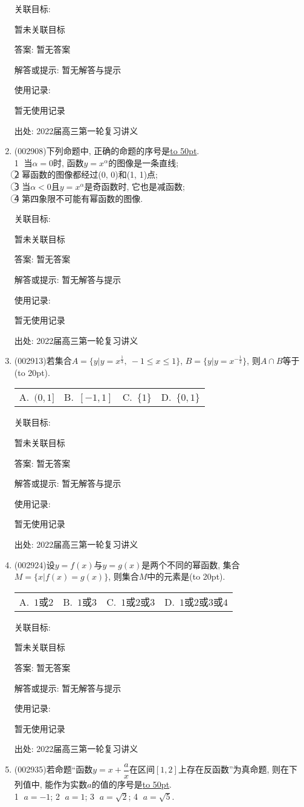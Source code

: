 \documentclass[10pt,a4paper]{article}
\newcommand{\blank}[1]{\underline{\hbox to #1pt{}}}
\newcommand{\bracket}[1]{(\hbox to #1pt{})}
\newcommand{\fourch}[4]{\par\begin{tabular}{p{.23\textwidth}p{.23\textwidth}p{.23\textwidth}p{.23\textwidth}}
A.~#1 &B.~#2& C.~#3& D.~#4
\end{tabular}}
\begin{document}
\begin{enumerate}[1.]
关联目标:

暂未关联目标

答案: 暂无答案

解答或提示: 暂无解答与提示

使用记录:

暂无使用记录


出处: 2022届高三第一轮复习讲义
\item { (002908)}下列命题中, 正确的命题的序号是\blank{50}.\\
\textcircled{1} 当$\alpha =0$时, 函数$y={x^{\alpha }}$的图像是一条直线;\\
\textcircled{2} 幂函数的图像都经过(0, 0)和(1, 1)点;\\
\textcircled{3} 当$\alpha <0$且$y={x^{\alpha }}$是奇函数时, 它也是减函数;\\
\textcircled{4} 第四象限不可能有幂函数的图像.


关联目标:

暂未关联目标

答案: 暂无答案

解答或提示: 暂无解答与提示

使用记录:

暂无使用记录


出处: 2022届高三第一轮复习讲义
\item { (002913)}若集合$A=\{y|y={x^{\frac 13}}, \ -1\le x\le 1\}$, $B=\{y|y={x^{-\frac 12}}\}$, 则$A\cap B$等于\bracket{20}.
\fourch{$(0,1]$}{$[-1,1]$}{$\{1\}$}{$\{0,1\}$}


关联目标:

暂未关联目标

答案: 暂无答案

解答或提示: 暂无解答与提示

使用记录:

暂无使用记录


出处: 2022届高三第一轮复习讲义
\item { (002924)}设$y=f(x)$与$y=g(x)$是两个不同的幂函数, 集合$M=\{x|f(x)=g(x)  \}$, 则集合$M$中的元素是\bracket{20}.
\fourch{$1$或$2$}{$1$或$3$}{$1$或$2$或$3$}{$1$或$2$或$3$或$4$}


关联目标:

暂未关联目标

答案: 暂无答案

解答或提示: 暂无解答与提示

使用记录:

暂无使用记录


出处: 2022届高三第一轮复习讲义
\item { (002935)}若命题``函数$y=x+\dfrac ax$在区间$[1,2]$上存在反函数''为真命题, 则在下列值中, 能作为实数$a$的值的序号是\blank{50}.\\
\textcircled{1} $a=-1$; \textcircled{2} $a=1$; \textcircled{3} $a=\sqrt 2$; \textcircled{4} $a=\sqrt 5$.



\end{enumerate}
\end{document}

